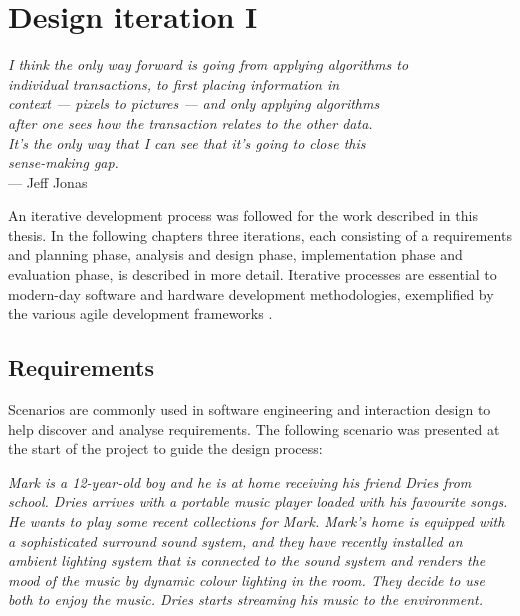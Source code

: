 \chapter{Design iteration I}
\label{DesignIteration1}

\begin{flushright}{\slshape    
I think the only way forward is going from applying algorithms to\\
individual transactions, to first placing information in \\
context --- pixels to pictures --- and only applying algorithms \\
after one sees how the transaction relates to the other data.\\
It's the only way that I can see that it's going to close this\\
 sense-making gap.} \\ \medskip
    --- Jeff Jonas \cite{AlexWoodie}
\end{flushright}



An iterative development process was followed for the work described in this thesis. In the following chapters three iterations, each consisting of a requirements and planning phase, analysis and design phase, implementation phase and evaluation phase, is described in more detail. Iterative processes are essential to modern-day software and hardware development methodologies, exemplified by the various agile development frameworks \cite{Larman2003}.

\section{Requirements}

Scenarios are commonly used in software engineering and interaction design to help discover and analyse requirements. The following scenario was presented at the start of the project to guide the design process:

\emph{Mark is a 12-year-old boy and he is at home receiving his friend Dries from school. Dries arrives with a portable music player loaded with his favourite songs. He wants to play some recent collections for Mark. Mark's home is equipped with a sophisticated surround sound system, and they have recently installed an ambient lighting system that is connected to the sound system and renders the mood of the music by dynamic colour lighting in the room. They decide to use both to enjoy the music. Dries starts streaming his music to the environment.}

